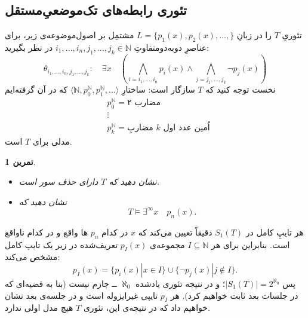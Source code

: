 \documentclass[12pt,a4paper]{report}
\theoremstyle{colorhead}
\newtheorem{tam}{تمرین}
\begin{document}
\subsection{تئوری رابطه‌های تک‌موضعیِ‌مستقل}
تئوریِ
$T$
را در زبانِ
$L=\{p_1(x),p_2(x),\ldots,\}$
مشتمِل بر اصول‌موضوعه‌ی زیر، برای عناصرِ دوبه‌دومتفاوتِ
$i_1,\ldots,i_n, j_1,\ldots,j_k\in \mathbb{N}$
در نظر بگیرید:
\[
\theta_{i_1,\ldots,i_n,j_1,\ldots,j_k}:\quad \exists x\quad \left( \bigwedge_{i=i_1,\ldots,i_n} p_i(x) \wedge \bigwedge_{j=j_1,\ldots, j_k} \neg p_j(x)\right)
\]
نخست توجه کنید که
$T$
سازگار است: ساختارِ
$\langle \mathbb{N}, p_0^\mathbb{N},p_1^\mathbb{N},\ldots\rangle$
که در آن گرفته‌ایم
\begin{align*}
& p_0^\mathbb{N}=\text{مضارب ۲}
\\
& 
\vdots \\
& 
p_k^\mathbb{N}=\text{مضاربِ $k$ اُمین عدد اول}
\end{align*}
مدلی برای
$T$
است. 
\begin{tam}\hfill 
\begin{itemize}
\item 
نشان دهید که
$T$
دارای حذف سور است.
\item 
نشان دهید که 
\[
T\models \exists^{\infty } x\quad  p_n(x).
\]
\end{itemize}
\end{tam}
هر تایپِ کامل در
$S_1(T)$
دقیقاً تعیین می‌کند که 
$x$
در کدام
$p_n$
ها
واقع و در کدام ناواقع است. بنابراین برای هر
$I\subseteq \mathbb{N}$
مجموعه‌ی
$p_I(x)$
تعریف‌شده در زیر یک تایپ کامل مشخص می‌کند:
\[
p_I(x)=\{p_i(x)|x\in I\} \cup \{\neg p_j(x)|j\not\in I\}.
\]
پس
$|S_1(T)|=2^{\aleph_0}$؛
و در نتیجه تئوری یادشده 
$\aleph_0$ ــ
جازم نیست (بنا به قضیه‌ای که در جلسات بعد ثابت خواهیم کرد).
هر
$p_I$
تایپی غیرایزوله است و در جلسه‌ی بعد نشان خواهیم داد که در نتیجه‌ی
این، تئوری
$T$
هیچ مدل اولی ندارد. 
\end{document}
